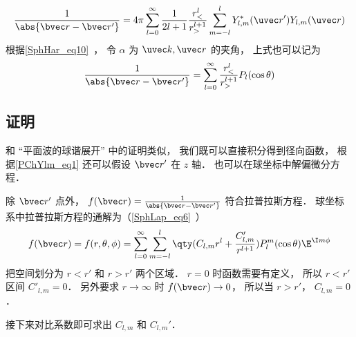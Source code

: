 
\begin{issues}
\issueDraft
\end{issues}


\begin{equation}
\frac{1}{\abs{\bvec r - \bvec r'}} = 4\pi \sum_{l=0}^{\infty} \frac{1}{2l+1} \frac{r_<^l}{r_>^{l+1}} \sum_{m = -l}^l Y_{l,m}^*(\uvec r') Y_{l,m}(\uvec r)
\end{equation}
根据\autoref{SphHar_eq10}~， 令 $\alpha$ 为 $\uvec k, \uvec r$ 的夹角， 上式也可以记为
\begin{equation}\label{PChYlm_eq1}
\frac{1}{\abs{\bvec r - \bvec r'}} = \sum_{l=0}^{\infty} \frac{r_<^l}{r_>^{l+1}} P_l(\cos\theta)
\end{equation}

\subsection{证明}
和 “平面波的球谐展开” 中的证明类似， 我们既可以直接积分得到径向函数， 根据\autoref{PChYlm_eq1} 还可以假设 $\bvec r'$ 在 $z$ 轴． 也可以在球坐标中解偏微分方程．

除 $\bvec r'$ 点外， $f(\bvec r) = \frac{1}{\abs{\bvec r - \bvec r'}}$ 符合拉普拉斯方程． 球坐标系中拉普拉斯方程的通解为（\autoref{SphLap_eq6}~）
\begin{equation}
f(\bvec r) = f(r, \theta, \phi) = \sum_{l = 0}^\infty \sum_{m = -l}^l \qty(C_{l,m} r^l + \frac{C'_{l,m}}{r^{l+1}})P_l^m(\cos\theta)\E^{\I m\phi}
\end{equation}
把空间划分为 $r < r'$ 和 $r > r'$ 两个区域． $r = 0$ 时函数需要有定义， 所以 $r < r'$ 区间 $C'_{l,m} = 0$． 另外要求 $r \to \infty$ 时 $f(\bvec r) \to 0$， 所以当 $r > r'$， $C_{l,m} = 0$．

接下来对比系数即可求出 $C_{l,m}$ 和 $C_{l,m}'$．
